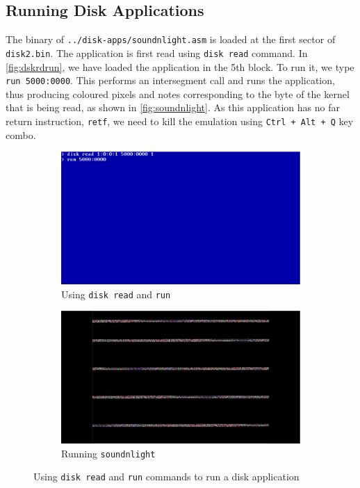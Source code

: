 \subsection{Running Disk Applications}
The binary of \texttt{../disk-apps/soundnlight.asm} is loaded at the first sector of \texttt{disk2.bin}. The application is first read using \texttt{disk read} command. In \autoref{fig:dskrdrun}, we have loaded the application in the 5th block. To run it, we type \texttt{run 5000:0000}. This performs an intersegment call and runs the application, thus producing coloured pixels and notes corresponding to the byte of the kernel that is being read, as shown in \autoref{fig:soundnlight}. As this application has no far return instruction, \texttt{retf}, we need to kill the emulation using \texttt{Ctrl + Alt + Q} key combo.
\begin{figure}[H]
  \begin{subfigure}{.5\textwidth}
  \centering
  \includegraphics[scale=0.13]{figures/dskrdrun.eps}
  \caption{Using \texttt{disk read} and \texttt{run}}
  \label{fig:dskrdrun}
  \end{subfigure}
  \begin{subfigure}{.5\textwidth}
  \centering
  \includegraphics[scale=0.13]{figures/soundnlight.eps}
  \caption{Running \texttt{soundnlight}}
  \label{fig:soundnlight}  
  \end{subfigure}
\caption{Using \texttt{disk read} and \texttt{run} commands to run a disk application}
\end{figure}

